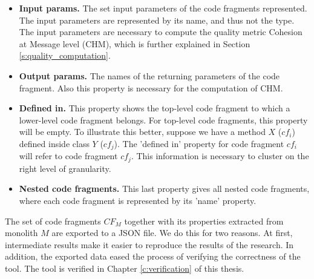 \begin{itemize}
    \item \textbf{Input params.} The set input parameters of the code fragments represented. The input parameters are represented by its name, and thus not the type. The input parameters are necessary to compute the quality metric Cohesion at Message level (CHM), which is further explained in Section \ref{s:quality_computation}.
    \item \textbf{Output params.} The names of the returning parameters of the code fragment. Also this property is necessary for the computation of CHM.
    \item \textbf{Defined in.} This property shows the top-level code fragment to which a lower-level code fragment belongs. For top-level code fragments, this property will be empty. To illustrate this better, suppose we have a method $X$ ($cf_i$) defined inside class $Y$ ($cf_j$). The 'defined in' property for code fragment $cf_i$ will refer to code fragment $cf_j$. This information is necessary to cluster on the right level of granularity. 
    \item \textbf{Nested code fragments.} This last property gives all nested code fragments, where each code fragment is represented by its 'name' property. 
\end{itemize}

The set of code fragments $CF_M$ together with its properties extracted from monolith $M$ are exported to a JSON file. We do this for two reasons. At first, intermediate results make it easier to reproduce the results of the research. In addition, the exported data eased the process of verifying the correctness of the tool. The tool is verified in Chapter \ref{c:verification} of this thesis.
    
